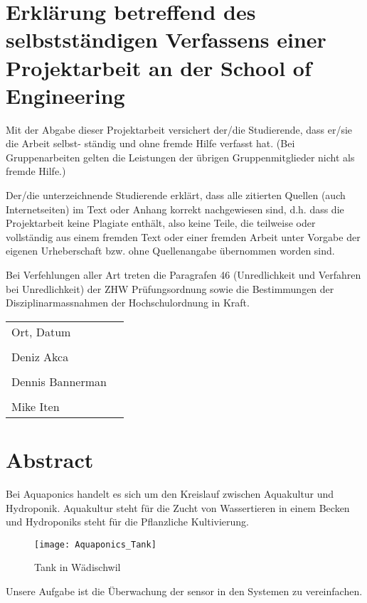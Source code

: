 \documentclass[../main.tex]{subfiles}
\begin{document}
	
	\section*{Erklärung betreffend des selbstständigen Verfassens einer Projektarbeit an der School of Engineering}
	
	Mit der Abgabe dieser Projektarbeit versichert der/die Studierende, dass er/sie die Arbeit selbst-
	ständig und ohne fremde Hilfe verfasst hat. (Bei Gruppenarbeiten gelten die Leistungen der übrigen
	Gruppenmitglieder nicht als fremde Hilfe.)\vspace{5mm}
	
	Der/die unterzeichnende Studierende erklärt, dass alle zitierten Quellen (auch Internetseiten) im Text
	oder Anhang korrekt nachgewiesen sind, d.h. dass die Projektarbeit keine Plagiate enthält, also keine
	Teile, die teilweise oder vollständig aus einem fremden Text oder einer fremden Arbeit unter Vorgabe der
	eigenen Urheberschaft bzw. ohne Quellenangabe übernommen worden sind.\vspace{5mm}
	
	Bei Verfehlungen aller Art treten die Paragrafen 46 (Unredlichkeit und Verfahren bei Unredlichkeit) der
	ZHW Prüfungsordnung sowie die Bestimmungen der Disziplinarmassnahmen der Hochschulordnung in
	Kraft.\vspace{15mm}
	
	\noindent\begin{tabular}{@{}p{2.5in}p{2.5in}@{}}
		Ort, Datum                       & \dotfill\\
		\\
		Deniz Akca                       & \dotfill\\
		\\
		Dennis Bannerman                 & \dotfill\\
		\\
		Mike Iten                        & \dotfill\\
	\end{tabular} 
	
	\newpage
	\section{Abstract}
	Bei Aquaponics handelt es sich um den Kreislauf zwischen Aquakultur und Hydroponik. Aquakultur steht für die Zucht von Wassertieren in einem Becken und Hydroponiks steht für die Pflanzliche Kultivierung. \\
	
	
	\begin{figure}[H]
		\centering
		\texttt{[image: Aquaponics\_Tank]}
		\caption{Tank in Wädischwil}
		\label{fig:Aquaponics_Tank}
	\end{figure}
	\par \noindent
	Unsere Aufgabe ist die Überwachung der \gls{sensor} in den Systemen zu vereinfachen. \\
	
\end{document}
